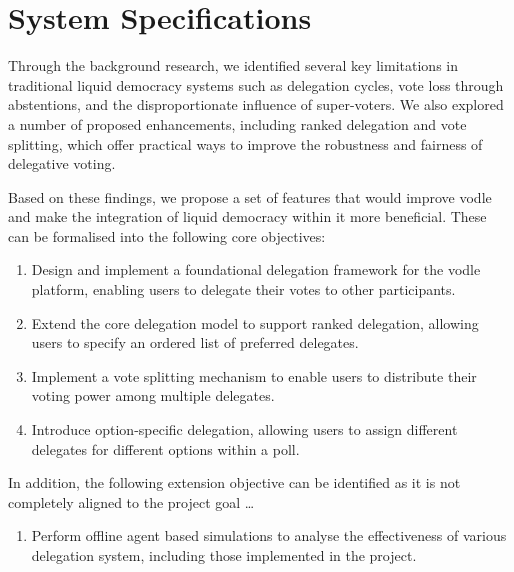 \chapter{System Specifications}
\label{ch:specifications}
Through the background research, we identified several key limitations in traditional liquid democracy systems such as delegation cycles, vote loss through abstentions, and the disproportionate influence of super-voters. We also explored a number of proposed enhancements, including ranked delegation and vote splitting, which offer practical ways to improve the robustness and fairness of delegative voting.

Based on these findings, we propose a set of features that would improve vodle and make the integration of liquid democracy within it more beneficial. These can be formalised into the following core objectives:

\begin{enumerate}
    \item Design and implement a foundational delegation framework for the vodle platform, enabling users to delegate their votes to other participants.

    \item Extend the core delegation model to support ranked delegation, allowing users to specify an ordered list of preferred delegates.

    \item Implement a vote splitting mechanism to enable users to distribute their voting power among multiple delegates.

    \item Introduce option-specific delegation, allowing users to assign different delegates for different options within a poll.
\end{enumerate}

In addition, the following extension objective can be identified as it is not completely aligned to the project goal \dots

\begin{enumerate}
    \item Perform offline agent based simulations to analyse the effectiveness of various delegation system, including those implemented in the project.
\end{enumerate}